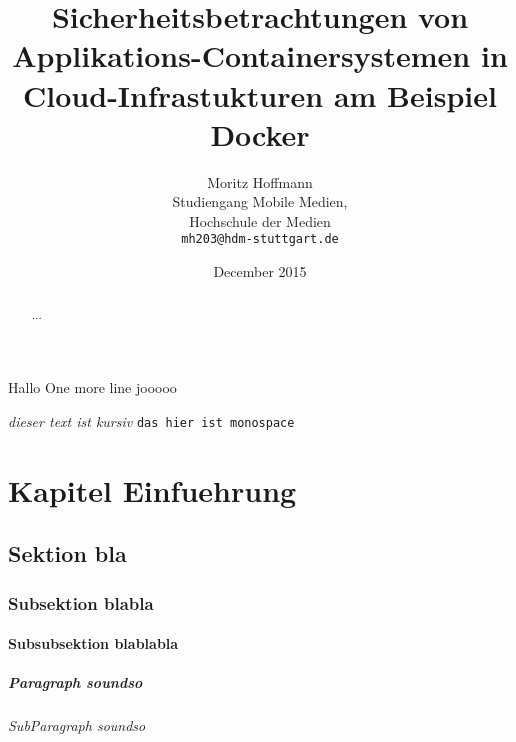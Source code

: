 \documentclass[11pt,a4paper,oneside]{report}
\begin{document}
\title{Sicherheitsbetrachtungen von Applikations-Containersystemen in Cloud-Infrastukturen am Beispiel Docker}
\author{Moritz Hoffmann\\
  Studiengang Mobile Medien,\\
  Hochschule der Medien\\
  \texttt{mh203@hdm-stuttgart.de}}
\date{December 2015}
\maketitle

\setcounter{secnumdepth}{3}
\setcounter{tocdepth}{5}
\renewcommand\abstractname{Abstract}



Hallo %
One more line %
jooooo \cite{Senn2009}

\emph{dieser text ist kursiv}
\texttt{das hier ist monospace}


\chapter{Kapitel Einfuehrung}
\section{Sektion bla}
\subsection{Subsektion blabla}
\subsubsection{Subsubsektion blablabla}
\paragraph{Paragraph soundso}
\subparagraph{SubParagraph soundso}

\begin{abstract}
...
\end{abstract}

\tableofcontents

\listoffigures

\listoftables

\appendix


\end{document}

